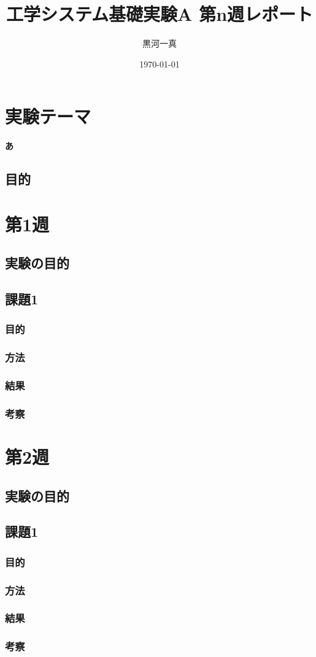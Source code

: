 \documentclass[a4paper]{ltjsarticle}
\title{工学システム基礎実験A 第n週レポート}
\author{黒河一真}
\date{\today}
\begin{document}

\section{実験テーマ}
\textbf{\large あ}
\subsection{目的}
\section{第1週}
\subsection{実験の目的}
\subsection{課題1}
\subsubsection{目的}
\subsubsection{方法}
\subsubsection{結果}
\subsubsection{考察}
\section{第2週}
\subsection{実験の目的}
\subsection{課題1}
\subsubsection{目的}
\subsubsection{方法}
\subsubsection{結果}
\subsubsection{考察}
\end{document}
